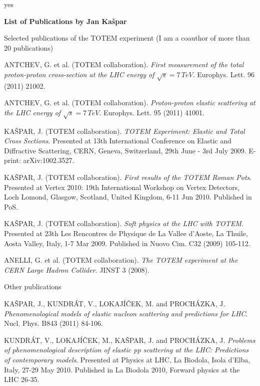 \def\yes{yes}



\ifx\InSummary\yes
\else
	
	

	\centerline{\bf List of Publications by Jan Ka\v spar}
	\baselineskip
\fi


\noindent Selected publications of the TOTEM experiment (I am a coauthor of more than 20 publications)

\> ANTCHEV, G. et al. (TOTEM collaboration). {\it First measurement of the total proton-proton cross-section at the LHC energy of $\sqrt s = 7\,TeV$}. Europhys. Lett. 96 (2011) 21002.

\> ANTCHEV, G. et al. (TOTEM collaboration). {\it Proton-proton elastic scattering at the LHC energy of $\sqrt s = 7\,TeV$}. Europhys. Lett. 95 (2011) 41001.

\> KAŠPAR, J. (TOTEM collaboration). {\it TOTEM Experiment: Elastic and Total Cross Sections}. Presented at 13th International Conference on Elastic and Diffractive Scattering, CERN, Geneva, Switzerland, 29th June - 3rd July 2009. E-print: arXiv:1002.3527.

\> KAŠPAR, J. (TOTEM collaboration). {\it First results of the TOTEM Roman Pots}. Presented at Vertex 2010: 19th International Workshop on Vertex Detectors, Loch Lomond, Glasgow, Scotland, United Kingdom, 6-11 Jun 2010. Published in PoS.

\> KAŠPAR, J. (TOTEM collaboration). {\it Soft physics at the LHC with TOTEM}. Presented at 23th Les Rencontres de Physique de La Vallee d'Aoste, La Thuile, Aosta Valley, Italy, 1-7 Mar 2009. Published in Nuovo Cim. C32 (2009) 105-112.

\> ANELLI, G. et al. (TOTEM collaboration). {\it The TOTEM experiment at the CERN Large Hadron Collider}. JINST 3 (2008).


\baselineskip
\noindent Other publications


\> KAŠPAR, J., KUNDRÁT, V., LOKAJÍČEK, M. and PROCHÁZKA, J. {\it Phenomenological models of elastic nucleon scattering and predictions for LHC}. Nucl. Phys. B843 (2011) 84-106.

\> KUNDRÁT, V., LOKAJÍČEK, M., KAŠPAR, J. and PROCHÁZKA, J. {\it Problems of phenomenological description of elastic pp scattering at the LHC: Predictions of contemporary models}. Presented at Physics at LHC, La Biodola, Isola d'Elba, Italy, 27-29 May 2010. Published in La Biodola 2010, Forward physics at the LHC 26-35.

